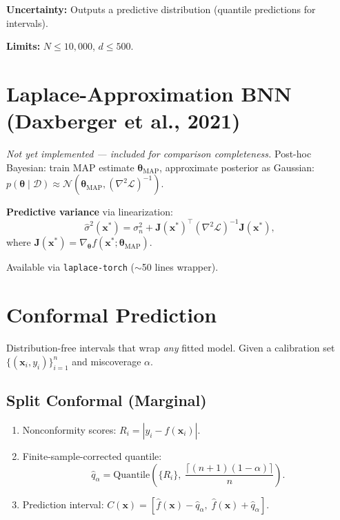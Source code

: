 \documentclass[11pt,a4paper]{article}
\theoremstyle{definition}
\newcommand{\bx}{\mathbf{x}}
\newcommand{\btheta}{\boldsymbol{\theta}}
\begin{document}
\textbf{Uncertainty:} Outputs a predictive distribution (quantile
predictions for intervals).

\textbf{Limits:} $N \leq 10{,}000$, $d \leq 500$.

\section{Laplace-Approximation BNN (Daxberger et al., 2021)}
\label{sec:laplace}

\emph{Not yet implemented --- included for comparison completeness.}
Post-hoc Bayesian: train MAP estimate $\btheta_{\mathrm{MAP}}$, approximate
posterior as Gaussian:
$p(\btheta \mid \mathcal{D}) \approx \mathcal{N}(\btheta_{\mathrm{MAP}}, (\nabla^2 \mathcal{L})^{-1})$.

\textbf{Predictive variance} via linearization:
\begin{equation}
  \hat{\sigma}^2(\bx^*) = \sigma_n^2 + \mathbf{J}(\bx^*)^\top (\nabla^2 \mathcal{L})^{-1} \mathbf{J}(\bx^*),
  \label{eq:laplace}
\end{equation}
where $\mathbf{J}(\bx^*) = \nabla_\btheta f(\bx^*; \btheta_{\mathrm{MAP}})$.

Available via \texttt{laplace-torch} ($\sim$50 lines wrapper).

\section{Conformal Prediction}
\label{sec:conformal}

Distribution-free intervals that wrap \emph{any} fitted model. Given a
calibration set $\{(\bx_i, y_i)\}_{i=1}^{n}$ and miscoverage $\alpha$.

\subsection{Split Conformal (Marginal)}
\label{sec:conformal_marginal}

\begin{enumerate}
  \item Nonconformity scores: $R_i = |y_i - \hat{f}(\bx_i)|$.
  \item Finite-sample-corrected quantile:
  \begin{equation}
    \hat{q}_\alpha = \text{Quantile}\left(\{R_i\}, \; \frac{\lceil (n+1)(1-\alpha) \rceil}{n}\right).
  \end{equation}
  \item Prediction interval:
  $C(\bx) = [\hat{f}(\bx) - \hat{q}_\alpha, \; \hat{f}(\bx) + \hat{q}_\alpha]$.
\end{enumerate}
\end{document}
